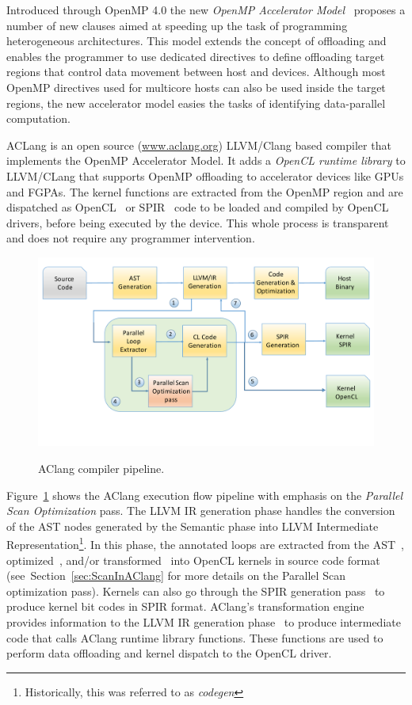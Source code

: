 \documentclass[Ingles]{ic-tese-v1}
\newcommand{\rsec}[1]{Section~\ref{sec:#1}}
\newcommand{\rfig}[1]{Figure~\ref{fig:#1}}
\newcommand{\tit}[1]{{\textit{#1}}}
\begin{document}
Introduced  through   OpenMP  4.0  the  new   \tit{OpenMP  Accelerator
Model}~\cite{Liao2013}  proposes a  number of  new clauses  aimed at
speeding up the task  of programming heterogeneous architectures. This
model extends the concept of  offloading and enables the programmer to
use  dedicated directives  to  define offloading  target regions  that
control data movement between host  and devices.  Although most OpenMP
directives used  for multicore  hosts can also  be used  inside the target
regions, the  new accelerator  model easies  the tasks  of identifying
data-parallel computation.

ACLang is an  open  source (\url{www.aclang.org})  LLVM/Clang
based compiler that implements the  OpenMP Accelerator Model.  It adds
a {\em  OpenCL runtime  library} to  LLVM/CLang that  supports OpenMP
offloading to  accelerator devices  like GPUs  and FGPAs.   The kernel
functions are extracted  from the OpenMP region and  are dispatched as
OpenCL~\cite{opencl}  or  SPIR~\cite{spir}  code   to  be  loaded  and
compiled by OpenCL  drivers, before being executed by  the device. This
whole  process is  transparent  and does  not  require any  programmer
intervention.

\begin{figure}[t]
	\caption{AClang compiler pipeline.}
	\centering
	\includegraphics[scale=0.45]{images/aclang_scan.pdf}
	\label{fig:aclang}
\end{figure}


\rfig{aclang} shows  the AClang execution flow  pipeline with
emphasis on the \textit{Parallel Scan Optimization} pass.  The
LLVM IR generation phase handles the conversion of the AST
nodes  generated   by  the  Semantic  phase   into  LLVM  Intermediate
Representation\footnote{Historically,   this  was   referred  to   as
	\textit{codegen}}.  In this phase, the annotated loops are extracted
from     the      AST~,     optimized~,     and/or
transformed~  into  OpenCL  kernels in  source  code  format~
(see~\rsec{ScanInAClang}   for  more   details   on  the   Parallel Scan
optimization pass).   Kernels can also go  through the SPIR
generation pass~ to produce kernel bit codes in SPIR format.
AClang's  transformation engine~  provides information
to  the LLVM  IR generation  phase~ to  produce intermediate
code  that  calls  AClang   runtime  library  functions.   These
functions are used  to perform data offloading and  kernel dispatch to
the  OpenCL  driver.
\end{document}

